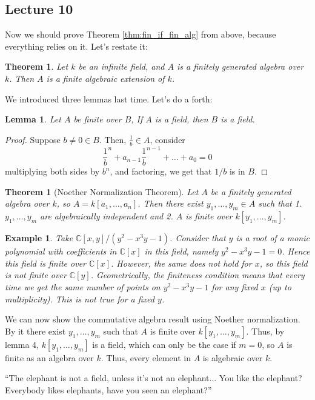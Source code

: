 \documentclass[12pt]{article}
\newcommand{\C}{\mathbb{C}}
\newtheorem*{example}{Example}
\newtheorem{theorem}{Theorem}[section]
\newtheorem*{theorem*}{Theorem}
\newtheorem{lemma}{Lemma}[section]
\begin{document}
    \subsection{Lecture 10}
    Now we should prove Theorem \ref{thm:fin_if_fin_alg} from above, because everything relies on it. Let's restate it:
    \begin{theorem*}
        Let $k$ be an infinite field, and $A$ is a finitely generated algebra over $k$. Then $A$ is a finite algebraic extension of $k$.
    \end{theorem*}
    We introduced three lemmas last time. Let's do a forth:
    \begin{lemma}
        Let $A$ be finite over $B$, If $A$ is a field, then $B$ is a field.
    \end{lemma}
    \begin{proof}
        Suppose $b \neq 0 \in B$. Then, $\frac{1}{b} \in A$, consider
        $$\frac{1}{b}^n + a_{n-1}\frac{1}{b}^{n-1} + \dots + a_0 = 0$$
        multiplying both sides by $b^n$, and factoring, we get that $1/b$ is in $B$.
    \end{proof}
    \begin{theorem}
        [Noether Normalization Theorem] Let $A$ be a finitely generated algebra over $k$, so $A = k[a_1, \dots, a_n]$. Then there exist $y_1, \dots, y_m \in A$ such that 1. $y_1, \dots, y_m$ are algebraically independent and 2. $A$ is finite over $k[y_1, \dots, y_m]$.
    \end{theorem}
    \begin{example}
        Take $\C[x, y]/(y^2 - x^3y - 1)$. Consider that $y$ is a root of a monic polynomial with coefficients in $\C[x]$ in this field, namely $y^2 - x^3y - 1 = 0$. Hence this field is finite over $\C[x]$. However, the same does not hold for $x$, so this field is not finite over $\C[y]$. Geometrically, the finiteness condition means that every time we get the same number of points on $y^2 - x^3y - 1$ for any fixed $x$ (up to multiplicity). This is not true for a fixed $y$.
    \end{example}
    We can now show the commutative algebra result using Noether normalization. By it there exist $y_1, \dots, y_m$ such that $A$ is finite over $k[y_1, \dots, y_m]$. Thus, by lemma 4, $k[y_1, \dots, y_m]$ is a field, which can only be the case if $m = 0$, so $A$ is finite as an algebra over $k$. Thus, every element in $A$ is algebraic over $k$. \par
    ``The elephant is not a field, unless it's not an elephant... You like the elephant? Everybody likes elephants, have you seen an elephant?'' \par
\end{document}
